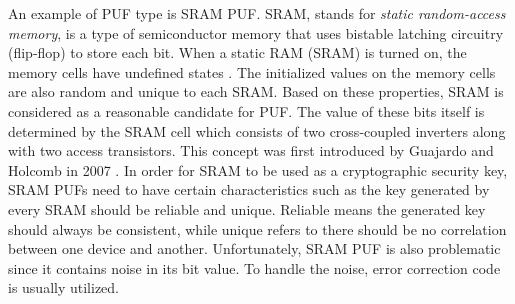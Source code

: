 An example of PUF type is SRAM PUF. SRAM, stands for \textit{static random-access memory}, is a type of semiconductor memory that uses bistable latching circuitry (flip-flop) to store each bit. When a static RAM (SRAM) is turned on, the memory cells have undefined states \cite{tuyls_2010}. The initialized values on the memory cells are also random and unique to each SRAM. Based on these properties, SRAM is considered as a reasonable candidate for PUF. The value of these bits itself is determined by the SRAM cell which consists of two cross-coupled inverters along with two access transistors. This concept was first introduced by Guajardo and Holcomb in 2007 \cite{guajardo_kumar_schrijen_tuyls}. In order for SRAM to be used as a cryptographic security key, SRAM PUFs need to have certain characteristics such as the key generated by every SRAM should be reliable and unique. Reliable means the generated key should always be consistent, while unique refers to there should be no correlation between one device and another.
Unfortunately, SRAM PUF is also problematic since it contains noise in its bit value. To handle the noise, error correction code is usually utilized.



